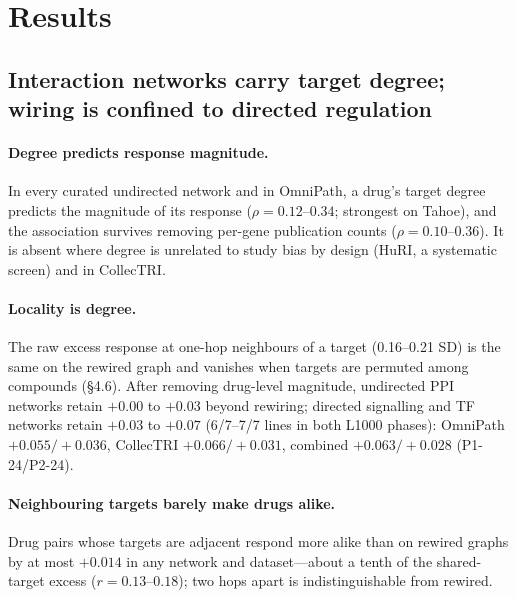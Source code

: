 \section{Results}

\subsection{Interaction networks carry target degree; wiring is confined to directed regulation}
\label{sec:info}

\paragraph{Degree predicts response magnitude.}
In every curated undirected network and in OmniPath, a drug's target degree predicts the magnitude of
its response ($\rho = 0.12$--$0.34$; strongest on Tahoe), and the association survives removing
per-gene publication counts ($\rho = 0.10$--$0.36$). It is absent where degree is unrelated to study
bias by design (HuRI, a systematic screen) and in CollecTRI.

\paragraph{Locality is degree.}
The raw excess response at one-hop neighbours of a target (0.16--0.21 SD) is the same on the rewired
graph and vanishes when targets are permuted among compounds (§4.6).
After removing drug-level magnitude, undirected PPI networks retain $+0.00$ to $+0.03$ beyond
rewiring; directed signalling and TF networks retain $+0.03$ to $+0.07$ (6/7--7/7 lines in both L1000
phases): OmniPath $+0.055/+0.036$, CollecTRI $+0.066/+0.031$, combined $+0.063/+0.028$ (P1-24/P2-24).

\paragraph{Neighbouring targets barely make drugs alike.}
Drug pairs whose targets are adjacent respond more alike than on rewired graphs by at most
$+0.014$ in any network and dataset---about a tenth of the shared-target excess ($r = 0.13$--$0.18$);
two hops apart is indistinguishable from rewired.

